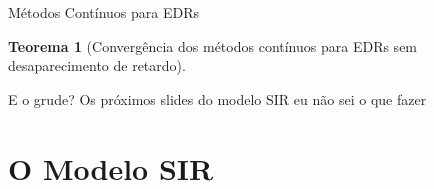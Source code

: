 \documentclass{beamer}
\theoremstyle{plain}
\newtheorem{teo}{Teorema}
\theoremstyle{definition}
\begin{document}
\begin{frame}{Métodos Contínuos para EDRs}
\begin{teo}[Convergência dos métodos contínuos para EDRs sem desaparecimento de retardo]

\end{teo}
\end{frame}


\begin{frame}{E o grude?}
    Os próximos slides do modelo SIR eu não sei o que fazer
\end{frame}


\section{O Modelo SIR}
\end{document}
